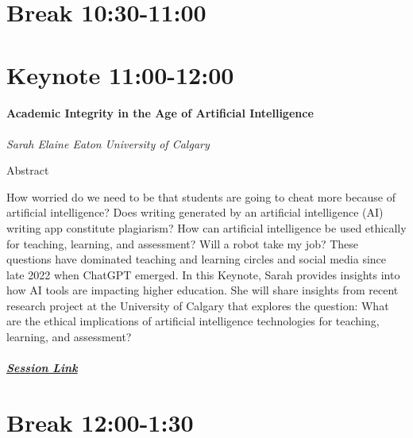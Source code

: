 \documentclass[
]{book}
\begin{document}
\hypertarget{break-1030-1100}{%
\section*{Break \textbar{} 10:30-11:00}\label{break-1030-1100}}

\hypertarget{keynote-1100-1200}{%
\section*{Keynote \textbar{} 11:00-12:00}\label{keynote-1100-1200}}

\begin{keynote}
\hypertarget{academic-integrity-in-the-age-of-artificial-intelligence}{%
\paragraph*{Academic Integrity in the Age of Artificial
Intelligence}\label{academic-integrity-in-the-age-of-artificial-intelligence}}

\emph{Sarah Elaine Eaton} \emph{University of Calgary}

Abstract

How worried do we need to be that students are going to cheat more
because of artificial intelligence? Does writing generated by an
artificial intelligence (AI) writing app constitute plagiarism? How can
artificial intelligence be used ethically for teaching, learning, and
assessment? Will a robot take my job? These questions have dominated
teaching and learning circles and social media since late 2022 when
ChatGPT emerged. In this Keynote, Sarah provides insights into how AI
tools are impacting higher education. She will share insights from
recent research project at the University of Calgary that explores the
question: What are the ethical implications of artificial intelligence
technologies for teaching, learning, and assessment?

\hypertarget{session-link}{%
\subparagraph*{\texorpdfstring{\href{}{Session
Link}}{Session Link}}\label{session-link}}
\end{keynote}

\hypertarget{break-1200-130}{%
\section*{Break \textbar{} 12:00-1:30}\label{break-1200-130}}
\end{document}
